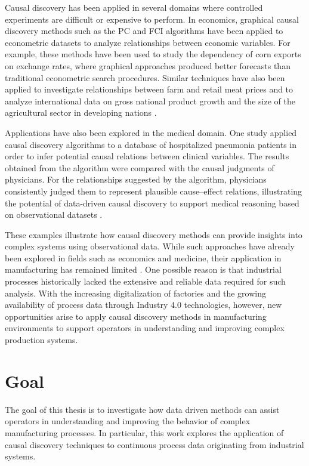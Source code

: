 Causal discovery has been applied in several domains where controlled experiments are difficult or expensive to perform. In economics, graphical causal discovery methods such as the PC and FCI algorithms have been applied to econometric datasets to analyze relationships between economic variables. For example, these methods have been used to study the dependency of corn exports on exchange rates, where graphical approaches produced better forecasts than traditional econometric search procedures. Similar techniques have also been applied to investigate relationships between farm and retail meat prices and to analyze international data on gross national product growth and the size of the agricultural sector in developing nations \cite{Spirtes2000}.

Applications have also been explored in the medical domain. One study applied causal discovery algorithms to a database of hospitalized pneumonia patients in order to infer potential causal relations between clinical variables. The results obtained from the algorithm were compared with the causal judgments of physicians. For the relationships suggested by the algorithm, physicians consistently judged them to represent plausible cause--effect relations, illustrating the potential of data-driven causal discovery to support medical reasoning based on observational datasets \cite{Spirtes2000}.

These examples illustrate how causal discovery methods can provide insights into complex systems using observational data. While such approaches have already been explored in fields such as economics and medicine, their application in manufacturing has remained limited \cite{Notyetman}. One possible reason is that industrial processes historically lacked the extensive and reliable data required for such analysis. With the increasing digitalization of factories and the growing availability of process data through Industry 4.0 technologies, however, new opportunities arise to apply causal discovery methods in manufacturing environments to support operators in understanding and improving complex production systems.

\n

\section{Goal}

The goal of this thesis is to investigate how data driven methods can assist operators in understanding and improving the behavior of complex manufacturing processes. In particular, this work explores the application of causal discovery techniques to continuous process data originating from industrial systems.

